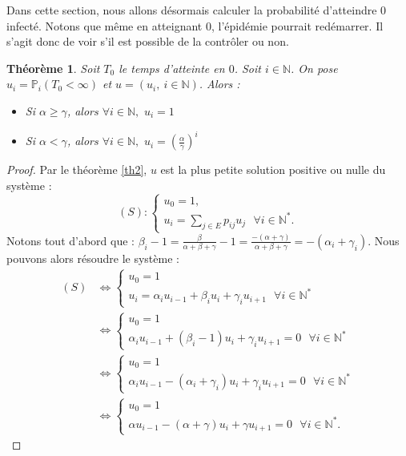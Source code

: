 \documentclass[12pt,a4paper]{report}
\newtheorem{thm}{Théorème}[section]
\theoremstyle{remark}
\begin{document}
Dans cette section, nous allons désormais calculer la probabilité d'atteindre $0$ infecté. Notons que même en atteignant $0$, l'épidémie pourrait redémarrer. Il s'agit donc de voir s'il est possible de la contrôler ou non.
\begin{thm}
Soit $T_0$ le temps d'atteinte en $0$. Soit $i \in \mathbb{N}$. On pose $u_i=\mathbb{P}_i(T_0 < \infty)$ et $u=(u_i,\  i\in \mathbb{N})$. Alors :
\begin{itemize}
    \item Si $\alpha \geqslant \gamma$, alors $\forall i \in \mathbb{N}, \, \, u_i = 1$
    \item  Si $\alpha < \gamma$, alors $\forall i \in \mathbb{N}, \, \, u_i = \left(\frac{\alpha}{\gamma}\right)^i$
\end{itemize}
\end{thm}
\begin{proof}
Par le théorème \ref{th2}, $u$ est la plus petite solution positive ou nulle du système :
$$(S) : \left\{
\begin{array}{ll}
        u_0=1,\\
        u_i= \sum\limits_{j\in E} p_{ij}u_j \ \ \ \forall i \in \mathbb{N}^*.
    \end{array}
\right.$$
Notons tout d'abord que : $\beta_i-1 = \frac{\beta}{\alpha+\beta+\gamma}-1 = \frac{-(\alpha+\gamma)}{\alpha+\beta+\gamma} = -(\alpha_i+\gamma_i).$ Nous pouvons alors résoudre le système :
\begin{align*}
(S) &\Longleftrightarrow  \left\{
\begin{array}{ll}
        u_0=1\\
        u_i= \alpha_i u_{i-1} + \beta_i u_i + \gamma_i u_{i+1} \ \ \ \forall i \in \mathbb{N}^*
    \end{array}
\right.  \\
&\Longleftrightarrow \left\{
\begin{array}{ll}
        u_0=1\\
        \alpha_i u_{i-1} + (\beta_i-1) u_i + \gamma_i u_{i+1} = 0 \ \ \ \forall i \in \mathbb{N}^*
    \end{array}
\right.  \\
 &\Longleftrightarrow \left\{
\begin{array}{ll}
        u_0=1\\
        \alpha_i u_{i-1} - (\alpha_i+\gamma_i) u_i + \gamma_i u_{i+1} = 0 \ \ \ \forall i \in \mathbb{N}^*
    \end{array}
\right.  \\
 &\Longleftrightarrow \left\{
\begin{array}{ll}
        u_0=1\\
        \alpha u_{i-1} - (\alpha+\gamma) u_i + \gamma u_{i+1} = 0 \ \ \ \forall i \in \mathbb{N}^*.
    \end{array}
\right.
\end{align*}


\end{proof}
\end{document}
